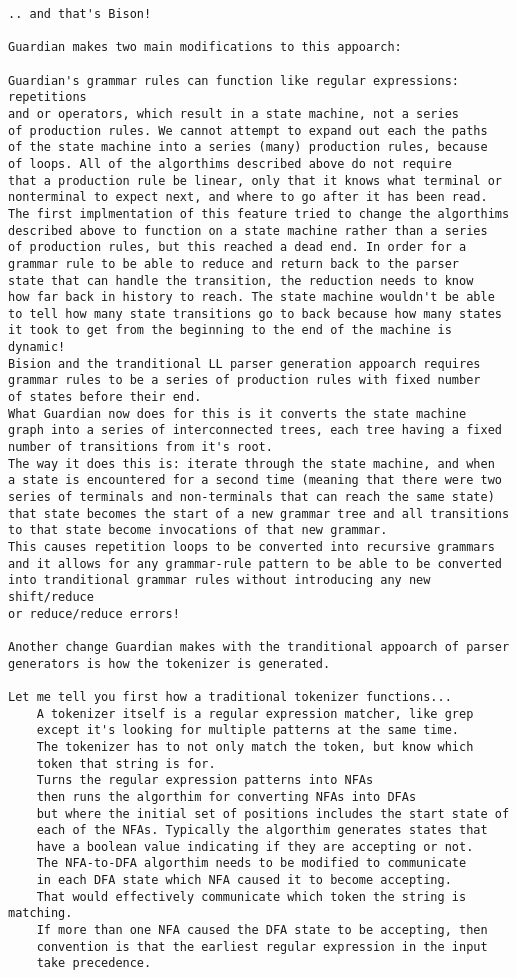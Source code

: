 {\begin{verbatim}
.. and that's Bison!

Guardian makes two main modifications to this appoarch:

Guardian's grammar rules can function like regular expressions: repetitions
and or operators, which result in a state machine, not a series
of production rules. We cannot attempt to expand out each the paths
of the state machine into a series (many) production rules, because
of loops. All of the algorthims described above do not require
that a production rule be linear, only that it knows what terminal or
nonterminal to expect next, and where to go after it has been read.
The first implmentation of this feature tried to change the algorthims
described above to function on a state machine rather than a series
of production rules, but this reached a dead end. In order for a
grammar rule to be able to reduce and return back to the parser
state that can handle the transition, the reduction needs to know
how far back in history to reach. The state machine wouldn't be able
to tell how many state transitions go to back because how many states
it took to get from the beginning to the end of the machine is dynamic!
Bision and the tranditional LL parser generation appoarch requires
grammar rules to be a series of production rules with fixed number
of states before their end.
What Guardian now does for this is it converts the state machine
graph into a series of interconnected trees, each tree having a fixed
number of transitions from it's root.
The way it does this is: iterate through the state machine, and when
a state is encountered for a second time (meaning that there were two
series of terminals and non-terminals that can reach the same state)
that state becomes the start of a new grammar tree and all transitions
to that state become invocations of that new grammar.
This causes repetition loops to be converted into recursive grammars
and it allows for any grammar-rule pattern to be able to be converted
into tranditional grammar rules without introducing any new shift/reduce
or reduce/reduce errors!

Another change Guardian makes with the tranditional appoarch of parser
generators is how the tokenizer is generated.

Let me tell you first how a traditional tokenizer functions...
	A tokenizer itself is a regular expression matcher, like grep
	except it's looking for multiple patterns at the same time.
	The tokenizer has to not only match the token, but know which
	token that string is for.
	Turns the regular expression patterns into NFAs
	then runs the algorthim for converting NFAs into DFAs
	but where the initial set of positions includes the start state of
	each of the NFAs. Typically the algorthim generates states that
	have a boolean value indicating if they are accepting or not.
	The NFA-to-DFA algorthim needs to be modified to communicate
	in each DFA state which NFA caused it to become accepting.
	That would effectively communicate which token the string is matching.
	If more than one NFA caused the DFA state to be accepting, then
	convention is that the earliest regular expression in the input
	take precedence.


\end{verbatim}}
